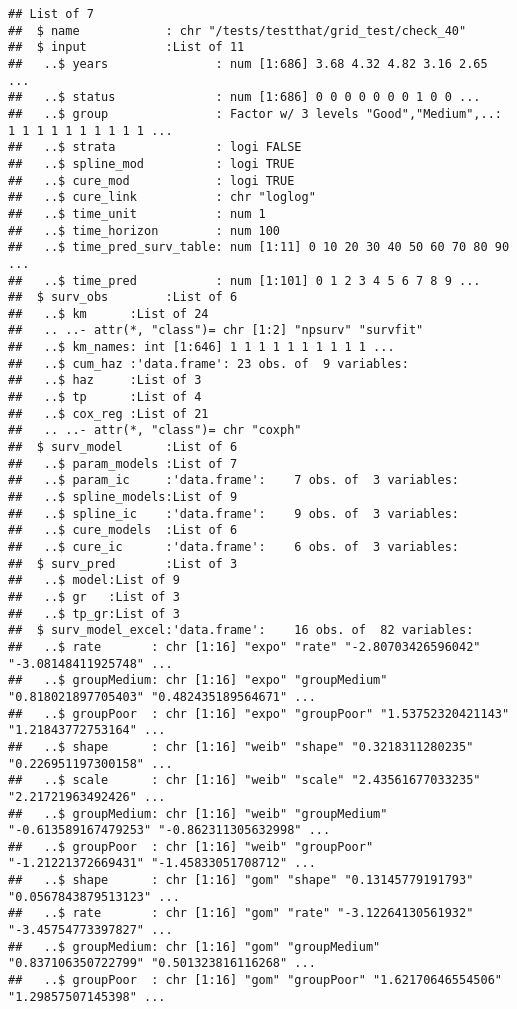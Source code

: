 \documentclass[
]{article}
\begin{document}
\begin{verbatim}
## List of 7
##  $ name            : chr "/tests/testthat/grid_test/check_40"
##  $ input           :List of 11
##   ..$ years               : num [1:686] 3.68 4.32 4.82 3.16 2.65 ...
##   ..$ status              : num [1:686] 0 0 0 0 0 0 0 1 0 0 ...
##   ..$ group               : Factor w/ 3 levels "Good","Medium",..: 1 1 1 1 1 1 1 1 1 1 ...
##   ..$ strata              : logi FALSE
##   ..$ spline_mod          : logi TRUE
##   ..$ cure_mod            : logi TRUE
##   ..$ cure_link           : chr "loglog"
##   ..$ time_unit           : num 1
##   ..$ time_horizon        : num 100
##   ..$ time_pred_surv_table: num [1:11] 0 10 20 30 40 50 60 70 80 90 ...
##   ..$ time_pred           : num [1:101] 0 1 2 3 4 5 6 7 8 9 ...
##  $ surv_obs        :List of 6
##   ..$ km      :List of 24
##   .. ..- attr(*, "class")= chr [1:2] "npsurv" "survfit"
##   ..$ km_names: int [1:646] 1 1 1 1 1 1 1 1 1 1 ...
##   ..$ cum_haz :'data.frame': 23 obs. of  9 variables:
##   ..$ haz     :List of 3
##   ..$ tp      :List of 4
##   ..$ cox_reg :List of 21
##   .. ..- attr(*, "class")= chr "coxph"
##  $ surv_model      :List of 6
##   ..$ param_models :List of 7
##   ..$ param_ic     :'data.frame':    7 obs. of  3 variables:
##   ..$ spline_models:List of 9
##   ..$ spline_ic    :'data.frame':    9 obs. of  3 variables:
##   ..$ cure_models  :List of 6
##   ..$ cure_ic      :'data.frame':    6 obs. of  3 variables:
##  $ surv_pred       :List of 3
##   ..$ model:List of 9
##   ..$ gr   :List of 3
##   ..$ tp_gr:List of 3
##  $ surv_model_excel:'data.frame':    16 obs. of  82 variables:
##   ..$ rate       : chr [1:16] "expo" "rate" "-2.80703426596042" "-3.08148411925748" ...
##   ..$ groupMedium: chr [1:16] "expo" "groupMedium" "0.818021897705403" "0.482435189564671" ...
##   ..$ groupPoor  : chr [1:16] "expo" "groupPoor" "1.53752320421143" "1.21843772753164" ...
##   ..$ shape      : chr [1:16] "weib" "shape" "0.3218311280235" "0.226951197300158" ...
##   ..$ scale      : chr [1:16] "weib" "scale" "2.43561677033235" "2.21721963492426" ...
##   ..$ groupMedium: chr [1:16] "weib" "groupMedium" "-0.613589167479253" "-0.862311305632998" ...
##   ..$ groupPoor  : chr [1:16] "weib" "groupPoor" "-1.21221372669431" "-1.45833051708712" ...
##   ..$ shape      : chr [1:16] "gom" "shape" "0.13145779191793" "0.0567843879513123" ...
##   ..$ rate       : chr [1:16] "gom" "rate" "-3.12264130561932" "-3.45754773397827" ...
##   ..$ groupMedium: chr [1:16] "gom" "groupMedium" "0.837106350722799" "0.501323816116268" ...
##   ..$ groupPoor  : chr [1:16] "gom" "groupPoor" "1.62170646554506" "1.29857507145398" ...

\end{verbatim}
\end{document}
